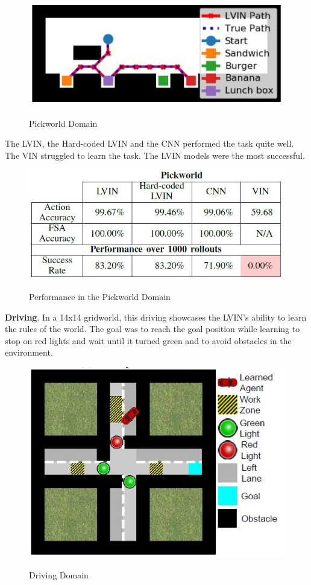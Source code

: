 \documentclass[letterpaper, 10 pt, conference]{ieeeconf}  %
\begin{document}
\begin{figure}[h]
 \centering
 \includegraphics[scale=.5]{Pickworld.JPG}\\
 \caption{Pickworld Domain}
\end{figure}
The LVIN, the Hard-coded LVIN and the CNN performed the task quite well. The VIN struggled to learn the task. The LVIN models were the most successful.
\begin{figure}[h]
 \centering
 \includegraphics[scale=.6]{PickworldResults.JPG}\\
 \caption{Performance in the Pickworld Domain}
\end{figure}
\newline
\textbf{Driving}. In a 14x14 gridworld, this driving showcases the LVIN's ability to learn the rules of the world. The goal was to reach the goal position while learning to stop on red lights and wait until it turned green and to avoid obstacles in the environment.
\begin{figure}[h]
 \centering
 \includegraphics[scale=.5]{Driving.JPG}\\
 \caption{Driving Domain}
\end{figure}
\end{document}
